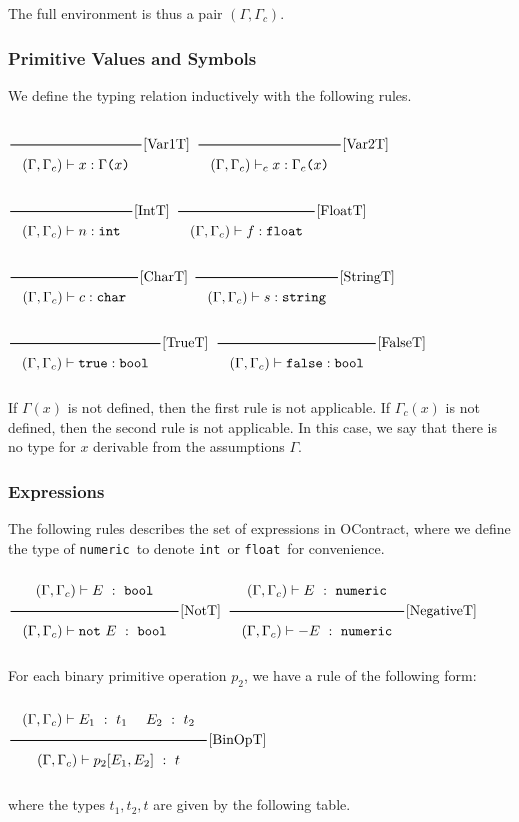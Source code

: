 \documentclass[a4paper]{article}
\newcommand{\RuleWithName}[3]{\genfrac{}{}{0.7pt}{}{{\setlength{\fboxrule}{0pt}\setlength{\fboxsep}{3mm}\fbox{$#1$}}}{{\setlength{\fboxrule}{0pt}\setlength{\fboxsep}{3mm}\fbox{$#2$}}}[\text{#3}]}
\newcommand{\TruE}{\texttt{true}}
\newcommand{\FalsE}{\texttt{false}}
\newcommand{\Int}{\texttt{int}}
\newcommand{\Float}{\texttt{float}}
\newcommand{\String}{\texttt{string}}
\newcommand{\Char}{\texttt{char}}
\newcommand{\Num}{\texttt{numeric}}
\newcommand{\Bool}{\texttt{bool}}
\newcommand{\Rp}{\texttt{)}}
\newcommand{\Lp}{\texttt{(}}
\begin{document}
The full environment is thus a pair $(\Gamma, \Gamma_c)$.

\subsubsection{Primitive Values and Symbols}

We define the typing relation inductively with the following rules.

$\RuleWithName{}{(\Gamma, \Gamma_c) \vdash x : \Gamma \Lp x \Rp}{Var1T}$
\hfill
$\RuleWithName{}{(\Gamma, \Gamma_c) \vdash_c x : \Gamma_c \Lp x \Rp}{Var2T}$
\hfill
$\RuleWithName{}{(\Gamma, \Gamma_c) \vdash n : \Int}{IntT}$
\hfill
$\RuleWithName{}{(\Gamma, \Gamma_c) \vdash f : \Float}{FloatT}$
\hfill
$\RuleWithName{}{(\Gamma, \Gamma_c) \vdash c : \Char}{CharT}$
\hfill
$\RuleWithName{}{(\Gamma, \Gamma_c) \vdash s : \String}{StringT}$
\hfill
$\RuleWithName{}{(\Gamma, \Gamma_c) \vdash \TruE : \Bool}{TrueT}$
\hfill
$\RuleWithName{}{(\Gamma, \Gamma_c) \vdash \FalsE : \Bool}{FalseT}$

If $\Gamma(x)$ is not defined, then the first rule is not applicable.
If $\Gamma_c(x)$ is not defined, then the second rule is not applicable.
In this case, we say that there is no type for $x$ derivable from the assumptions $\Gamma$.

\subsubsection{Expressions}

The following rules describes the set of expressions in OContract,
where we define the type of \Num\ to denote \Int\ or \Float\ for convenience.

$\RuleWithName{(\Gamma, \Gamma_c) \vdash E\ :\ \Bool}{(\Gamma, \Gamma_c) \vdash \texttt{not}\ E\ :\ \Bool}{NotT}$
\hfill
$\RuleWithName{(\Gamma, \Gamma_c) \vdash E\ :\ \Num}{(\Gamma, \Gamma_c) \vdash - E\ :\ \Num}{NegativeT}$

For each binary primitive operation $p_2$, we have a rule of the following form:

\begin{center}
    $\RuleWithName{(\Gamma, \Gamma_c) \vdash E_1\ :\ t_1\ \quad E_2\ :\ t_2}{(\Gamma, \Gamma_c) \vdash p_2[E_1, E_2]\ :\ t}{BinOpT}$
\end{center}

where the types $t_1, t_2, t$ are given by the following table.
\end{document}
